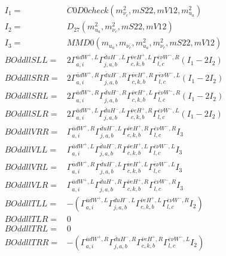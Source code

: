 \documentclass[A4,landscape]{article}
\begin{document}
\begin{align} 
I_1 = & C0D0check(m^2_{\nu_{{c}}}, mS22, mV12, m^2_{u_{{a}}}) \\ 
I_2 = & D_{27}(m^2_{u_{{a}}}, m^2_{\nu_{{c}}}, mS22, mV12) \\ 
I_3 = & MMD0(m_{u_{{a}}}, m_{\nu_{{c}}}, m^2_{u_{{a}}}, m^2_{\nu_{{c}}}, mS22, mV12) \\ 
  BOddllSLL= & 2  \Gamma^{\bar{u}d W^+,L}_{a, i} \Gamma^{\bar{d}u H^- ,L}_{j, a, b} \Gamma^{\bar{\nu}e H^+,L}_{c, k, b} \Gamma^{\bar{e}\nu W^- ,R}_{l, c} (I_1 - 2 I_2) \\ 
  BOddllSRR= & 2  \Gamma^{\bar{u}d W^+,R}_{a, i} \Gamma^{\bar{d}u H^- ,R}_{j, a, b} \Gamma^{\bar{\nu}e H^+,R}_{c, k, b} \Gamma^{\bar{e}\nu W^- ,L}_{l, c} (I_1 - 2 I_2) \\ 
  BOddllSRL= & 2  \Gamma^{\bar{u}d W^+,R}_{a, i} \Gamma^{\bar{d}u H^- ,R}_{j, a, b} \Gamma^{\bar{\nu}e H^+,L}_{c, k, b} \Gamma^{\bar{e}\nu W^- ,R}_{l, c} (I_1 - 2 I_2) \\ 
  BOddllSLR= & 2  \Gamma^{\bar{u}d W^+,L}_{a, i} \Gamma^{\bar{d}u H^- ,L}_{j, a, b} \Gamma^{\bar{\nu}e H^+,R}_{c, k, b} \Gamma^{\bar{e}\nu W^- ,L}_{l, c} (I_1 - 2 I_2) \\ 
  BOddllVRR= &  \Gamma^{\bar{u}d W^+,R}_{a, i} \Gamma^{\bar{d}u H^- ,L}_{j, a, b} \Gamma^{\bar{\nu}e H^+,R}_{c, k, b} \Gamma^{\bar{e}\nu W^- ,R}_{l, c} I_3 \\ 
  BOddllVLL= &  \Gamma^{\bar{u}d W^+,L}_{a, i} \Gamma^{\bar{d}u H^- ,R}_{j, a, b} \Gamma^{\bar{\nu}e H^+,L}_{c, k, b} \Gamma^{\bar{e}\nu W^- ,L}_{l, c} I_3 \\ 
  BOddllVRL= &  \Gamma^{\bar{u}d W^+,R}_{a, i} \Gamma^{\bar{d}u H^- ,L}_{j, a, b} \Gamma^{\bar{\nu}e H^+,L}_{c, k, b} \Gamma^{\bar{e}\nu W^- ,L}_{l, c} I_3 \\ 
  BOddllVLR= &  \Gamma^{\bar{u}d W^+,L}_{a, i} \Gamma^{\bar{d}u H^- ,R}_{j, a, b} \Gamma^{\bar{\nu}e H^+,R}_{c, k, b} \Gamma^{\bar{e}\nu W^- ,R}_{l, c} I_3 \\ 
  BOddllTLL= & -( \Gamma^{\bar{u}d W^+,L}_{a, i} \Gamma^{\bar{d}u H^- ,L}_{j, a, b} \Gamma^{\bar{\nu}e H^+,L}_{c, k, b} \Gamma^{\bar{e}\nu W^- ,R}_{l, c} I_2) \\ 
  BOddllTLR= & 0 \\ 
  BOddllTRL= & 0 \\ 
  BOddllTRR= & -( \Gamma^{\bar{u}d W^+,R}_{a, i} \Gamma^{\bar{d}u H^- ,R}_{j, a, b} \Gamma^{\bar{\nu}e H^+,R}_{c, k, b} \Gamma^{\bar{e}\nu W^- ,L}_{l, c} I_2) \\ 
\end{align} 
\end{document}
